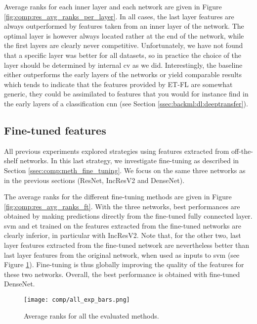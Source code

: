 Average ranks for each inner layer and each network are given in Figure \ref{fig:comp:res_avg_ranks_per_layer}. In all cases, the last layer features are always outperformed by features taken from an inner layer of the network. The optimal layer is however always located rather at the end of the network, while the first layers are clearly never competitive. Unfortunately, we have not found that a specific layer was better for all datasets, so in practice the choice of the layer should be determined by internal \acrlong{cv} as we did. Interestingly, the baseline either outperforms the early layers of the networks or yield comparable results which tends to indicate that the features provided by ET-FL are somewhat generic, \ie they could be assimilated to features that you would for instance find in the early layers of a classification \acrshort{cnn} (see Section \ref{ssec:backml:dl:deeptransfer}). 

\subsection{Fine-tuned features}
\label{ssec:comp:exp_fine_tuning}

All previous experiments explored strategies using features extracted from off-the-shelf networks. In this last strategy, we investigate fine-tuning as described in Section \ref{ssec:comp:meth_fine_tuning}. We focus on the same three networks as in the previous sections (ResNet, IncResV2 and DenseNet).

The average ranks for the different fine-tuning methods are given in Figure \ref{fig:comp:res_avg_ranks_ft}. With the three networks, best performances are obtained by making predictions directly from the fine-tuned fully connected layer. \acrshort{svm} and \acrshort{et} trained on the features extracted from the fine-tuned networks are clearly inferior, in particular with IncResV2. Note that, for the other two, last layer features extracted from the fine-tuned network are nevertheless better than last layer features from the original network, when used as inputs to \acrshort{svm} (see Figure \ref{fig:comp:res_avg_ranks_all_methods}). Fine-tuning is thus globally improving the quality of the features for these two networks. Overall, the best performance is obtained with fine-tuned DenseNet.


\begin{figure}
    \centering 
    \texttt{[image: comp/all\_exp\_bars.png]}
    \caption{Average ranks for all the evaluated methods.}
    \label{fig:comp:res_avg_ranks_all_methods}
\end{figure}

